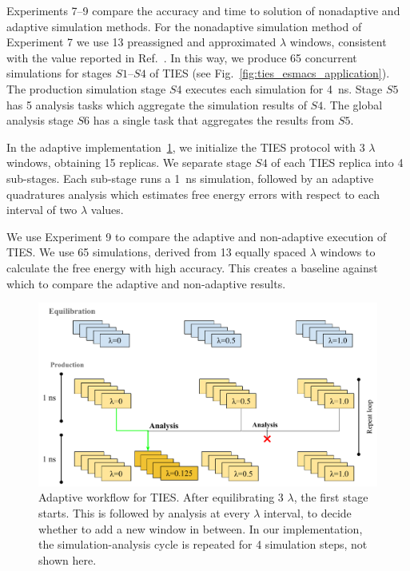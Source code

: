 Experiments 7--9 compare the accuracy and time to solution of nonadaptive and
adaptive simulation methods. For the nonadaptive simulation method of
Experiment 7 we use 13 preassigned and approximated $\lambda$ windows,
consistent with the value reported in Ref.~\cite{Bhati2017}. In this way, we
produce 65 concurrent simulations for stages $S1$--$S4$ of TIES (see
Fig.~\ref{fig:ties_esmacs_application}). The production simulation stage $S4$
executes each simulation for \SI{4}{\nano\second}. Stage $S5$ has 5 analysis
tasks which aggregate the simulation results of $S4$. The global analysis
stage $S6$ has a single task that aggregates the results from $S5$.

In the adaptive implementation~\ref{fig:adaptive_TIES}, we initialize the
TIES protocol with 3 $\lambda$ windows, obtaining 15 replicas. We separate
stage $S4$ of each TIES replica into 4 sub-stages. Each sub-stage runs a
\SI{1}{\nano\second} simulation, followed by an adaptive quadratures analysis
which estimates free energy errors with respect to each interval of two
$\lambda$ values.

We use Experiment 9 to compare the adaptive and non-adaptive execution of
TIES. We use %
65 simulations, derived from 13 equally spaced $\lambda$ windows to calculate
the free energy with high accuracy. This creates a baseline against which to
compare the adaptive and non-adaptive results.

\begin{figure}
  \centering
  \includegraphics[width=\columnwidth]{figures/Adaptive_TIES.pdf}
  \caption{Adaptive workflow for TIES. After equilibrating 3 $\lambda$, the
  first stage starts. This is followed by analysis at every $\lambda$
  interval, to decide whether to add a new window in between. In our
  implementation, the simulation-analysis cycle is repeated for 4 simulation
  steps, not shown here.}\label{fig:adaptive_TIES}
\up{}
\up{}
\up{}
\end{figure}

